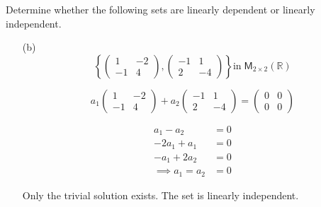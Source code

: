 Determine whether the following sets are linearly dependent or
linearly independent.
\begin{enumerate}
\item[(b)] 
\[
\left\{\begin{pmatrix}
1 & -2\\
-1 & 4
\end{pmatrix}
,
\begin{pmatrix}
-1 & 1\\
2 & -4
\end{pmatrix}\right\} 
\text{in}\;\mathsf{M}_{2\times2}(\mathbb{R})\]

\begin{equation}
a_1\begin{pmatrix}
1 & -2\\
-1 & 4
\end{pmatrix} +a_2
\begin{pmatrix}
-1 & 1\\
2 & -4
\end{pmatrix} =
\begin{pmatrix}
0 & 0\\
0 & 0
\end{pmatrix}
\end{equation}

\begin{align}
a_1 -a _2 &= 0\\
-2a_1 +a_1 &= 0\\
-a_1+2a_2 &= 0\\
\implies a_1 = a_2 &= 0
\end{align}


Only the trivial solution exists. The set is linearly independent.



\end{enumerate}
